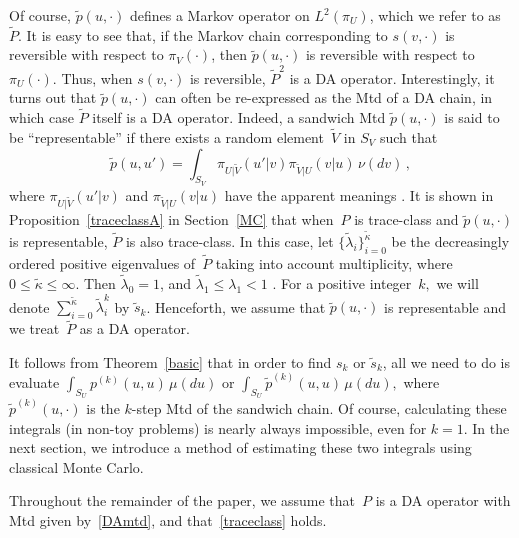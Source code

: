 \documentclass[11pt]{article}
\begin{document}
        Of course, $\tilde{p}(u,\cdot)$ defines a Markov operator on
        $L^2(\pi_U)$, which we refer to as~$\tilde{P}$.  It is easy to
        see that, if the Markov chain corresponding to $s(v,\cdot)$ is
        reversible with respect to $\pi_V(\cdot)$, then
        $\tilde{p}(u,\cdot)$ is reversible with respect to
        $\pi_U(\cdot)$.  Thus, when $s(v,\cdot)$ is reversible,
        $\tilde{P}^2$ is a DA operator.  Interestingly, it turns out
        that $\tilde{p}(u,\cdot)$ can often be re-expressed as the Mtd
        of a DA chain, in which case $\tilde{P}$ itself is a DA
        operator.  Indeed, a sandwich Mtd $\tilde{p}(u,\cdot)$ is said
        to be ``representable'' if there exists a random
        element~$\tilde{V}$ in $S_V$ such that
	\begin{equation} \label{representable} \tilde{p}(u,u') =
          \int_{S_V} \pi_{U|\tilde{V}}(u'|v) \pi_{\tilde{V}|U}(v|u) \,
          \nu(dv) \,,
	\end{equation}
	where $\pi_{U|\tilde{V}}(u'|v)$ and $\pi_{\tilde{V}|U}(v|u)$
        have the apparent meanings \citep[see, e.g.][]{hobe:2011}.  It
        is shown in Proposition~\ref{traceclassA} in Section~\ref{MC}
        that when~$P$ is trace-class and $\tilde{p}(u,\cdot)$ is
        representable, $\tilde{P}$ is also trace-class.  In this case,
        let $\{\tilde{\lambda}_i\}_{i=0}^{\tilde{\kappa}}$ be the
        decreasingly ordered positive eigenvalues of~$\tilde{P}$ taking into
        account multiplicity, where $0 \leq \tilde{\kappa} \leq
        \infty$.  Then $\tilde{\lambda}_0 = 1$, and $\tilde{\lambda}_1
        \leq \lambda_1 < 1$ \citep{hobert2008theoretical}.  For a
        positive integer~$k,$ we will denote
        $\sum_{i=0}^{\tilde{\kappa}} \tilde{\lambda}_i^k$ by
        $\tilde{s}_k$.  Henceforth, we assume that $\tilde{p}(u,\cdot)$
        is representable and we treat~$\tilde{P}$ as a DA operator.
	
	It follows from Theorem~\ref{basic} that in order to find
        $s_k$ or $\tilde{s}_k$, all we need to do is evaluate
        $\int_{S_U} p^{(k)}(u,u) \,\mu(du)$ or $\int_{S_U}
        \tilde{p}^{(k)}(u,u) \,\mu(du),$ where
        $\tilde{p}^{(k)}(u,\cdot)$ is the $k$-step Mtd of the sandwich
        chain.  Of course, calculating these integrals (in non-toy
        problems) is nearly always impossible, even for $k=1$.  In the
        next section, we introduce a method of estimating these two
        integrals using classical Monte Carlo.
	
	Throughout the remainder of the paper, we assume that~$P$ is a
        DA operator with Mtd given by~\eqref{DAmtd}, and
        that~\eqref{traceclass} holds.
\end{document}
